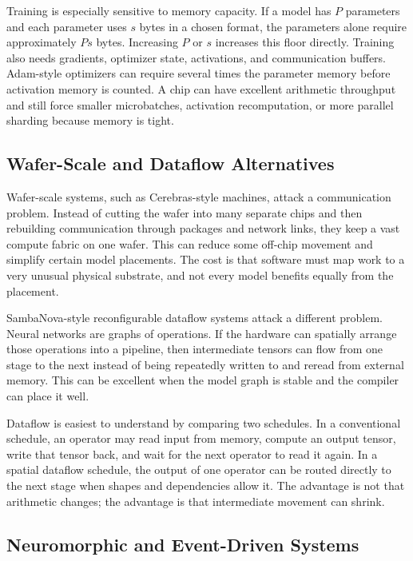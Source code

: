 Training is especially sensitive to memory capacity. If a model has \(P\) parameters and each parameter uses \(s\) bytes in a chosen format, the parameters alone require approximately \(P s\) bytes. Increasing \(P\) or \(s\) increases this floor directly. Training also needs gradients, optimizer state, activations, and communication buffers. Adam-style optimizers can require several times the parameter memory before activation memory is counted. A chip can have excellent arithmetic throughput and still force smaller microbatches, activation recomputation, or more parallel sharding because memory is tight.

\subsection{Wafer-Scale and Dataflow Alternatives}

Wafer-scale systems, such as Cerebras-style machines, attack a communication problem. Instead of cutting the wafer into many separate chips and then rebuilding communication through packages and network links, they keep a vast compute fabric on one wafer. This can reduce some off-chip movement and simplify certain model placements. The cost is that software must map work to a very unusual physical substrate, and not every model benefits equally from the placement.

SambaNova-style reconfigurable dataflow systems attack a different problem. Neural networks are graphs of operations. If the hardware can spatially arrange those operations into a pipeline, then intermediate tensors can flow from one stage to the next instead of being repeatedly written to and reread from external memory. This can be excellent when the model graph is stable and the compiler can place it well.

Dataflow is easiest to understand by comparing two schedules. In a conventional schedule, an operator may read input from memory, compute an output tensor, write that tensor back, and wait for the next operator to read it again. In a spatial dataflow schedule, the output of one operator can be routed directly to the next stage when shapes and dependencies allow it. The advantage is not that arithmetic changes; the advantage is that intermediate movement can shrink.

\subsection{Neuromorphic and Event-Driven Systems}

